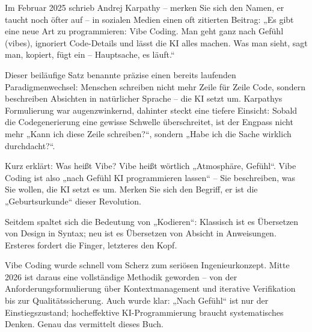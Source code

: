 


Im Februar 2025 schrieb Andrej Karpathy – merken Sie sich den Namen, er taucht noch öfter auf – in sozialen Medien einen oft zitierten Beitrag: „Es gibt eine neue Art zu programmieren: Vibe Coding. Man geht ganz nach Gefühl (vibes), ignoriert Code-Details und lässt die KI alles machen. Was man sieht, sagt man, kopiert, fügt ein – Hauptsache, es läuft.“

Dieser beiläufige Satz benannte präzise einen bereits laufenden Paradigmenwechsel: Menschen schreiben nicht mehr Zeile für Zeile Code, sondern beschreiben Absichten in natürlicher Sprache – die KI setzt um. Karpathys Formulierung war augenzwinkernd, dahinter steckt eine tiefere Einsicht: Sobald die Codegenerierung eine gewisse Schwelle überschreitet, ist der Engpass nicht mehr „Kann ich diese Zeile schreiben?“, sondern „Habe ich die Sache wirklich durchdacht?“.

\begin{tcbinfo}{Kurz erklärt: Was heißt Vibe?}
Vibe heißt wörtlich „Atmosphäre, Gefühl“. Vibe Coding ist also „nach Gefühl KI programmieren lassen“ – Sie beschreiben, was Sie wollen, die KI setzt es um. Merken Sie sich den Begriff, er ist die „Geburtsurkunde“ dieser Revolution.

\end{tcbinfo}

Seitdem spaltet sich die Bedeutung von „Kodieren“: Klassisch ist es Übersetzen von Design in Syntax; neu ist es Übersetzen von Absicht in Anweisungen. Ersteres fordert die Finger, letzteres den Kopf.

Vibe Coding wurde schnell vom Scherz zum seriösen Ingenieurkonzept. Mitte 2026 ist daraus eine vollständige Methodik geworden – von der Anforderungsformulierung über Kontextmanagement und iterative Verifikation bis zur Qualitätssicherung. Auch wurde klar: „Nach Gefühl“ ist nur der Einstiegszustand; hocheffektive KI-Programmierung braucht systematisches Denken. Genau das vermittelt dieses Buch.


